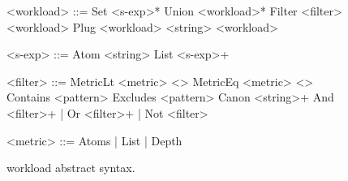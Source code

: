 \documentclass{article}
\begin{document}


\renewcommand\denote[1]{\ensuremath{\left\llbracket #1 \right\rrbracket}}
\newcommand\set[2]{\ensuremath{\left\{#1 \hspace{3pt} \left\vert \hspace{3pt} #2 \right.\right\}}}
\newcommand\plugsexp{\ensuremath{\mathsf{plug\_sexp}}}


\begin{figure}%
  \begin{minipage}[t]{0.45\linewidth}
    \begin{grammar}
    <workload> ::=  Set <s-exp>*
      \alt Union <workload>*
      \alt Filter <filter> <workload>
      \alt Plug <workload> <string> <workload>

    <s-exp> ::=  Atom <string> \alt List <s-exp>+

    \end{grammar}
  \end{minipage}\hfill%
  \begin{minipage}[t]{0.5\linewidth}
    \begin{grammar}

    <filter> ::=
      MetricLt <metric> <\N>
      \alt MetricEq <metric> <\N>
      \alt Contains <pattern>
      \alt Excludes <pattern>
      \alt Canon <string>+
      \alt And <filter>+ | Or <filter>+ | Not <filter>

    <metric> ::= Atoms | List | Depth
    \end{grammar}%
    \end{minipage}%
  \caption{workload abstract syntax.}
\end{figure}
\end{document}

